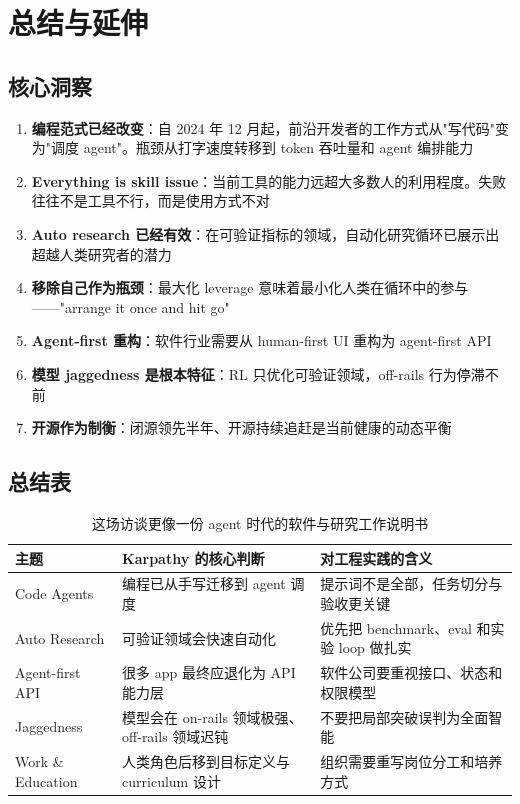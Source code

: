 \section{总结与延伸}

\subsection{核心洞察}

\begin{enumerate}
    \item \textbf{编程范式已经改变}：自 2024 年 12 月起，前沿开发者的工作方式从"写代码"变为"调度 agent"。瓶颈从打字速度转移到 token 吞吐量和 agent 编排能力
    \item \textbf{Everything is skill issue}：当前工具的能力远超大多数人的利用程度。失败往往不是工具不行，而是使用方式不对
    \item \textbf{Auto research 已经有效}：在可验证指标的领域，自动化研究循环已展示出超越人类研究者的潜力
    \item \textbf{移除自己作为瓶颈}：最大化 leverage 意味着最小化人类在循环中的参与——"arrange it once and hit go"
    \item \textbf{Agent-first 重构}：软件行业需要从 human-first UI 重构为 agent-first API
    \item \textbf{模型 jaggedness 是根本特征}：RL 只优化可验证领域，off-rails 行为停滞不前
    \item \textbf{开源作为制衡}：闭源领先半年、开源持续追赶是当前健康的动态平衡
\end{enumerate}

\subsection{总结表}

\begin{table}[H]
\centering
\begin{tabular}{p{3.0cm}p{4.5cm}p{4.4cm}}
\toprule
\textbf{主题} & \textbf{Karpathy 的核心判断} & \textbf{对工程实践的含义} \\
\midrule
Code Agents & 编程已从手写迁移到 agent 调度 & 提示词不是全部，任务切分与验收更关键 \\
Auto Research & 可验证领域会快速自动化 & 优先把 benchmark、eval 和实验 loop 做扎实 \\
Agent-first API & 很多 app 最终应退化为 API 能力层 & 软件公司要重视接口、状态和权限模型 \\
Jaggedness & 模型会在 on-rails 领域极强、off-rails 领域迟钝 & 不要把局部突破误判为全面智能 \\
Work \& Education & 人类角色后移到目标定义与 curriculum 设计 & 组织需要重写岗位分工和培养方式 \\
\bottomrule
\end{tabular}
\caption{这场访谈更像一份 agent 时代的软件与研究工作说明书}
\end{table}

